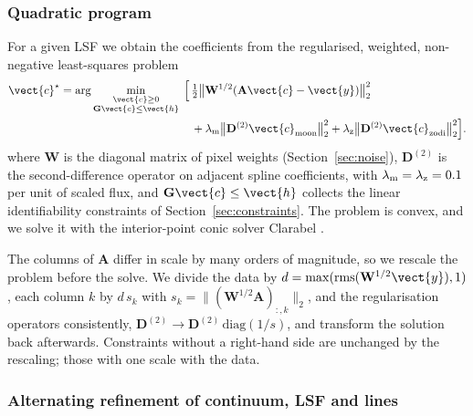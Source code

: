 \subsubsection{Quadratic program}
\label{sec:qp}

For a given LSF we obtain the coefficients from the regularised, weighted,
non-negative least-squares problem
\begin{equation}
\begin{split}
  \vect{c}^\star = \arg\min_{\substack{\vect{c}\ge 0\\ \mathbf{G}\vect{c}\le\vect{h}}}\;
  \Big[\,&\tfrac12\big\lVert \mathbf{W}^{1/2}(\mathbf{A}\vect{c}-\vect{y})\big\rVert_2^2\\
  &+ \lambda_{\rm m}\big\lVert \mathbf{D}^{(2)}\vect{c}_{\rm moon}\big\rVert_2^2
  + \lambda_{\rm z}\big\lVert \mathbf{D}^{(2)}\vect{c}_{\rm zodi}\big\rVert_2^2\Big].
\end{split}
  \label{eq:qp}
\end{equation}
where $\mathbf{W}$ is the diagonal matrix of pixel weights
(Section~\ref{sec:noise}), $\mathbf{D}^{(2)}$ is the second-difference
operator on adjacent spline coefficients, with
$\lambda_{\rm m} = \lambda_{\rm z} = 0.1$ per unit of scaled flux, and
$\mathbf{G}\vect{c}\le\vect{h}$ collects the linear identifiability
constraints of Section~\ref{sec:constraints}. The problem is convex, and we
solve it with the interior-point conic solver Clarabel \citep{Goulart2024}.

The columns of $\mathbf{A}$ differ in scale by many orders of magnitude, so
we rescale the problem before the solve. We divide the data by
$d = \max(\mathrm{rms}(\mathbf{W}^{1/2}\vect{y}),1)$, each column $k$ by
$d\,s_k$ with $s_k = \lVert(\mathbf{W}^{1/2}\mathbf{A})_{:,k}\rVert_2$, and
the regularisation operators consistently,
$\mathbf{D}^{(2)}\to\mathbf{D}^{(2)}\,\mathrm{diag}(1/s)$, and transform the
solution back afterwards. Constraints without a right-hand side are unchanged
by the rescaling; those with one scale with the data.

\subsubsection{Alternating refinement of continuum, LSF and lines}

